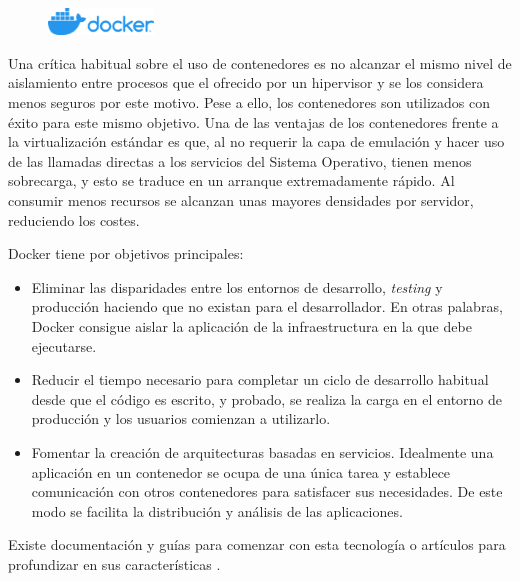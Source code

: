 \begin{figure}
    \centering
    \includegraphics[width=0.25\textwidth]{imaxes/e-fundamentos-tecnologicos/logo-docker.png}
\end{figure}

Una crítica habitual sobre el uso de contenedores es no alcanzar el mismo nivel de aislamiento entre procesos que el ofrecido por un hipervisor y se los considera menos seguros por este motivo. Pese a ello, los contenedores son utilizados con éxito para este mismo objetivo. Una de las ventajas de los contenedores frente a la virtualización estándar es que, al no requerir la capa de emulación y hacer uso de las llamadas directas a los servicios del Sistema Operativo, tienen menos sobrecarga, y esto se traduce en un arranque extremadamente rápido. Al consumir menos recursos se alcanzan unas mayores densidades por servidor, reduciendo los costes.

Docker tiene por objetivos principales:
\begin{itemize}
    \item Eliminar las disparidades entre los entornos de desarrollo, \emph{testing} y producción haciendo que no existan para el desarrollador. En otras palabras, Docker consigue aislar la aplicación de la infraestructura en la que debe ejecutarse.
    \item Reducir el tiempo necesario para completar un ciclo de desarrollo habitual desde que el código es escrito, y probado, se realiza la carga en el entorno de producción y los usuarios comienzan a utilizarlo.
    \item Fomentar la creación de arquitecturas basadas en servicios. Idealmente una aplicación en un contenedor se ocupa de una única tarea y establece comunicación con otros contenedores para satisfacer sus necesidades. De este modo se facilita la distribución y análisis de las aplicaciones.
\end{itemize}

Existe documentación y guías para comenzar con esta tecnología \cite{dockerInc_web_startGuides} o artículos para profundizar en sus características \cite{turnbull_book_dockerBook}.

